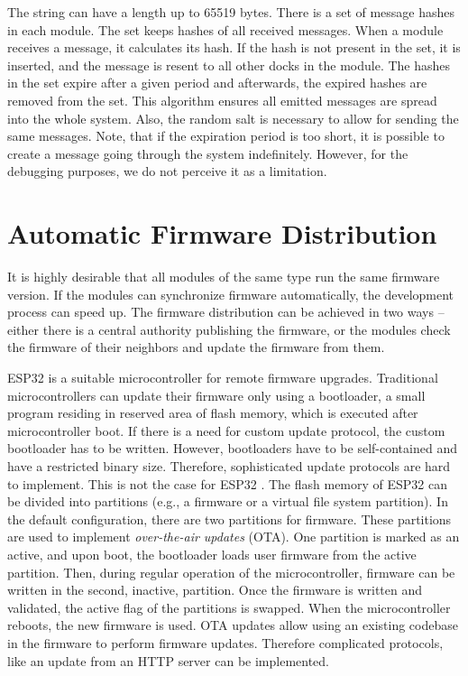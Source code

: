 \noindent The string can have a length up to 65519 bytes. There is a set of
message hashes in each module. The set keeps hashes of all received messages.
When a module receives a message, it calculates its hash. If the hash is not
present in the set, it is inserted, and the message is resent to all other docks
in the module. The hashes in the set expire after a given period and afterwards,
the expired hashes are removed from the set. This algorithm ensures all emitted
messages are spread into the whole system. Also, the random salt is necessary to
allow for sending the same messages. Note, that if the expiration period is too
short, it is possible to create a message going through the system indefinitely.
However, for the debugging purposes, we do not perceive it as a limitation.

\section{Automatic Firmware Distribution} \label{sec:firmware_distribution}

It is highly desirable that all modules of the same type run the same firmware
version. If the modules can synchronize firmware automatically, the development
process can speed up. The firmware distribution can be achieved in two ways --
either there is a central authority publishing the firmware, or the modules
check the firmware of their neighbors and update the firmware from them.

ESP32 is a suitable microcontroller for remote firmware upgrades. Traditional
microcontrollers can update their firmware only using a bootloader, a small
program residing in reserved area of flash memory, which is executed after
microcontroller boot. If there is a need for custom update protocol, the custom
bootloader has to be written. However, bootloaders have to be self-contained and
have a restricted binary size. Therefore, sophisticated update protocols are
hard to implement. This is not the case for ESP32
\cite{noauthor_esp-idf_nodate}. The flash memory of ESP32 can be divided into
partitions (e.g., a firmware or a virtual file system partition). In the default
configuration, there are two partitions for firmware. These partitions are used
to implement \emph{over-the-air updates} (OTA). One partition is marked as an
active, and upon boot, the bootloader loads user firmware from the active
partition. Then, during regular operation of the microcontroller, firmware can
be written in the second, inactive, partition. Once the firmware is written and
validated, the active flag of the partitions is swapped. When the
microcontroller reboots, the new firmware is used. OTA updates allow using an
existing codebase in the firmware to perform firmware updates. Therefore
complicated protocols, like an update from an HTTP server can be implemented.

